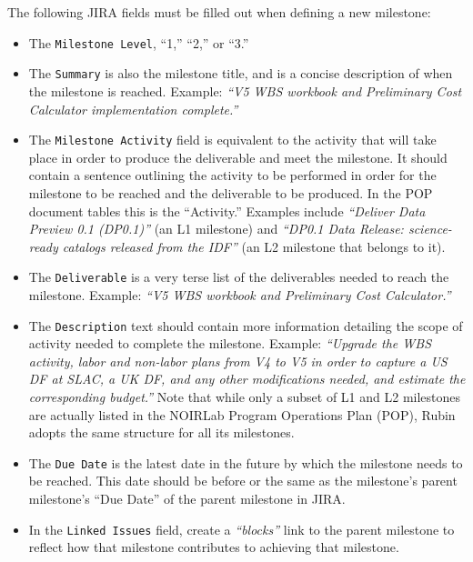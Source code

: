 The following \gls{JIRA} fields must be filled out when defining a new milestone:
\begin{itemize}
\item The \texttt{Milestone Level}, ``1,'' ``2,'' or ``3.''
\item The \texttt{Summary} is also the milestone title, and is a concise description of when the milestone is reached.
Example: \textit{``V5 \gls{WBS} workbook and Preliminary Cost Calculator implementation complete.''}
\item The \texttt{Milestone Activity} field is equivalent to the activity that will take place in order to produce the deliverable and meet the milestone.  It should contain a sentence outlining the activity to be performed in order for the milestone to be reached and the deliverable to be produced. In the \gls{POP} document tables this is the ``Activity.''
  Examples include \textit{``Deliver Data Preview 0.1 (DP0.1)''} (an L1 milestone) and \textit{``DP0.1 \gls{Data Release}: science-ready catalogs released from the \gls{IDF}''} (an L2 milestone that belongs to it).
\item The \texttt{Deliverable} is a very terse list of the deliverables needed to reach the milestone.
  Example: \textit{``V5 \gls{WBS} workbook and Preliminary Cost Calculator.''}
\item The \texttt{Description} text should contain more information detailing the scope of activity needed to complete the milestone.
  Example: \textit{``Upgrade the \gls{WBS} activity, labor and non-labor plans from V4 to V5 in order to capture a \gls{US} \gls{DF} at SLAC, a \gls{UK} \gls{DF}, and any other modifications needed, and estimate the corresponding budget.''}
  Note that while only a subset of L1 and L2 milestones are actually listed in the \gls{NOIRLab} Program \gls{Operations} Plan (\gls{POP}), Rubin adopts the same structure for all its milestones.
\item The \texttt{Due Date} is the latest date in the future by which the milestone needs to be reached.
  This date should be before or the same as the milestone's parent milestone's ``Due Date'' of the parent milestone in \gls{JIRA}.
\item In the \texttt{Linked Issues} field, create a \textit{``blocks''} link to the parent milestone to reflect how that milestone contributes to achieving that milestone.
\end{itemize}


